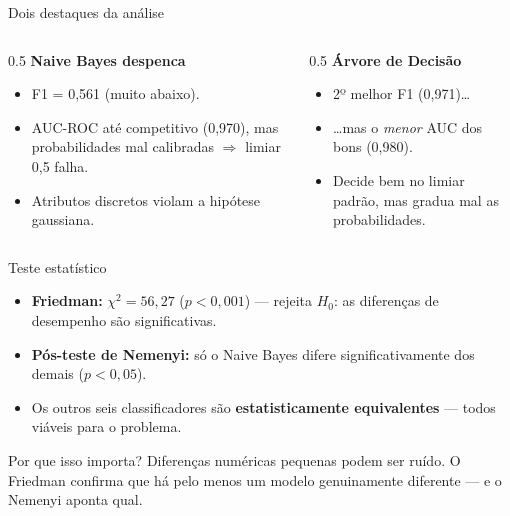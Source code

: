 \documentclass[aspectratio=169,12pt]{beamer}
\newcommand{\naiveBayesFOne}{0,561}
\newcommand{\friedmanChi}{56,27}
\begin{document}
\begin{frame}{Dois destaques da análise}
  \begin{columns}[T]
    \begin{column}{0.5\textwidth}
      \textbf{Naive Bayes despenca}
      \begin{itemize}
        \item F1 = \naiveBayesFOne{} (muito abaixo).
        \item AUC-ROC até competitivo (0,970), mas probabilidades mal
              calibradas $\Rightarrow$ limiar 0,5 falha.
        \item Atributos discretos violam a hipótese gaussiana.
      \end{itemize}
    \end{column}
    \begin{column}{0.5\textwidth}
      \textbf{Árvore de Decisão}
      \begin{itemize}
        \item 2º melhor F1 (0,971)\ldots
        \item \ldots mas o \emph{menor} AUC dos bons (0,980).
        \item Decide bem no limiar padrão, mas gradua mal as probabilidades.
      \end{itemize}
    \end{column}
  \end{columns}
\end{frame}

\begin{frame}{Teste estatístico}
  \begin{itemize}
    \item \textbf{Friedman:} $\chi^2 = \friedmanChi{}$ ($p < 0,001$) — rejeita
          $H_0$: as diferenças de desempenho são significativas.
    \item \textbf{Pós-teste de Nemenyi:} só o Naive Bayes difere
          significativamente dos demais ($p < 0,05$).
    \item Os outros seis classificadores são \textbf{estatisticamente
          equivalentes} — todos viáveis para o problema.
  \end{itemize}
  \vfill
  \begin{block}{Por que isso importa?}
    Diferenças numéricas pequenas podem ser ruído. O Friedman confirma que há
    pelo menos um modelo genuinamente diferente — e o Nemenyi aponta qual.
  \end{block}
\end{frame}
\end{document}

